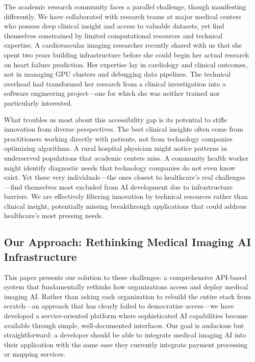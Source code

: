 \documentclass[12pt,a4paper]{article}
\begin{document}
The academic research community faces a parallel challenge, though manifesting differently. We have collaborated with research teams at major medical centers who possess deep clinical insight and access to valuable datasets, yet find themselves constrained by limited computational resources and technical expertise. A cardiovascular imaging researcher recently shared with us that she spent two years building infrastructure before she could begin her actual research on heart failure prediction. Her expertise lay in cardiology and clinical outcomes, not in managing GPU clusters and debugging data pipelines. The technical overhead had transformed her research from a clinical investigation into a software engineering project—one for which she was neither trained nor particularly interested.

What troubles us most about this accessibility gap is its potential to stifle innovation from diverse perspectives. The best clinical insights often come from practitioners working directly with patients, not from technology companies optimizing algorithms. A rural hospital physician might notice patterns in underserved populations that academic centers miss. A community health worker might identify diagnostic needs that technology companies do not even know exist. Yet these very individuals—the ones closest to healthcare's real challenges—find themselves most excluded from AI development due to infrastructure barriers. We are effectively filtering innovation by technical resources rather than clinical insight, potentially missing breakthrough applications that could address healthcare's most pressing needs.

\subsection{Our Approach: Rethinking Medical Imaging AI Infrastructure}

This paper presents our solution to these challenges: a comprehensive API-based system that fundamentally rethinks how organizations access and deploy medical imaging AI. Rather than asking each organization to rebuild the entire stack from scratch—an approach that has clearly failed to democratize access—we have developed a service-oriented platform where sophisticated AI capabilities become available through simple, well-documented interfaces. Our goal is audacious but straightforward: a developer should be able to integrate medical imaging AI into their application with the same ease they currently integrate payment processing or mapping services.
\end{document}
